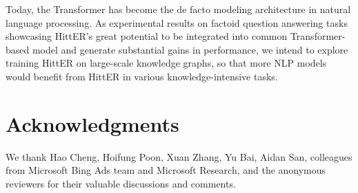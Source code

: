 \documentclass[11pt]{article}
\newcommand{\hit}{HittER\xspace}
\begin{document}
Today, the Transformer has become the de facto modeling architecture in natural language processing.
As experimental results on factoid question answering tasks showcasing \hit{}'s great potential to be integrated into common Transformer-based model and generate substantial gains in performance, we intend to explore training \hit{} on large-scale knowledge graphs, so that more NLP models would benefit from \hit{} in various knowledge-intensive tasks.

\section*{Acknowledgments}
\label{sec:ack}
We thank Hao Cheng, Hoifung Poon, Xuan Zhang, Yu Bai, Aidan San, colleagues from Microsoft Bing Ads team and Microsoft Research, and
the anonymous reviewers for their valuable discussions and comments. 







\newpage
\appendix
\end{document}
